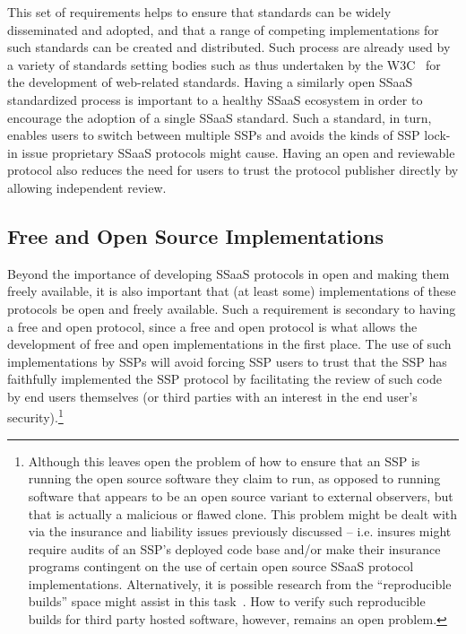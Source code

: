 This set of requirements helps to ensure that standards can be widely
disseminated and adopted, and that a range of competing
implementations for such standards can be created and
distributed. Such process are already used by a variety of standards
setting bodies such as thus undertaken by the W3C~\cite{w3c} for the
development of web-related standards. Having a similarly open SSaaS
standardized process is important to a healthy SSaaS ecosystem in
order to encourage the adoption of a single SSaaS standard. Such a
standard, in turn, enables users to switch between multiple SSPs and
avoids the kinds of SSP lock-in issue proprietary SSaaS protocols
might cause. Having an open and reviewable protocol also reduces the
need for users to trust the protocol publisher directly by allowing
independent review.

\subsection{Free and Open Source Implementations}

Beyond the importance of developing SSaaS protocols in open and making
them freely available, it is also important that (at least some)
implementations of these protocols be open and freely available. Such
a requirement is secondary to having a free and open protocol, since a
free and open protocol is what allows the development of free and open
implementations in the first place. The use of such implementations by
SSPs will avoid forcing SSP users to trust that the SSP has faithfully
implemented the SSP protocol by facilitating the review of such code
by end users themselves (or third parties with an interest in the end
user's security).\footnote{Although this leaves open the problem of
  how to ensure that an SSP is running the open source software they
  claim to run, as opposed to running software that appears to be an
  open source variant to external observers, but that is actually a
  malicious or flawed clone. This problem might be dealt with via the
  insurance and liability issues previously discussed -- i.e. insures
  might require audits of an SSP's deployed code base and/or make
  their insurance programs contingent on the use of certain open
  source SSaaS protocol implementations. Alternatively, it is possible
  research from the ``reproducible builds'' space might assist in this
  task~\cite{DeCarnedeCarnavalet2014}. How to verify such reproducible
  builds for third party hosted software, however, remains an open
  problem.}


